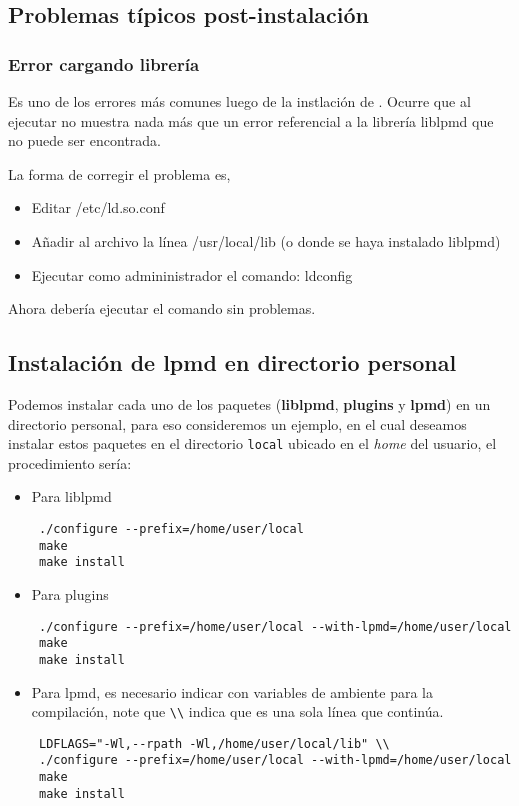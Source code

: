 \subsection{Problemas t\'ipicos post-instalaci\'on}

\subsubsection{Error cargando librer\'ia}

Es uno de los errores m\'as comunes luego de la instlaci\'on de {\lpmd}. Ocurre que al ejecutar {\lpmd} no muestra nada m\'as que un error referencial a la librer\'ia liblpmd que no puede ser encontrada.

La forma de corregir el problema es,

\begin{itemize}
 \item Editar /etc/ld.so.conf
 \item A\~nadir al archivo la l\'inea /usr/local/lib (o donde se haya instalado liblpmd)
 \item Ejecutar como admininistrador el comando: ldconfig
\end{itemize}

Ahora deber\'ia ejecutar el comando sin problemas.

\subsection{Instalaci\'on de lpmd en directorio personal}
\label{subsub:personaldir}

Podemos instalar cada uno de los paquetes (\textbf{liblpmd}, \textbf{plugins} y \textbf{lpmd}) en un directorio personal, para eso consideremos un ejemplo, en el cual deseamos instalar estos paquetes en el directorio \verb|local| ubicado en el \textit{home} del usuario, el procedimiento ser\'ia:

\begin{itemize}
 \item Para liblpmd
 \begin{verbatim}
 ./configure --prefix=/home/user/local
 make
 make install
 \end{verbatim}
 \item Para plugins
 \begin{verbatim}
 ./configure --prefix=/home/user/local --with-lpmd=/home/user/local
 make
 make install
 \end{verbatim}
 \item Para lpmd, es necesario indicar con variables de ambiente para la compilaci\'on, note que \verb|\\| indica que es una sola l\'inea que contin\'ua.
 \begin{verbatim}
 LDFLAGS="-Wl,--rpath -Wl,/home/user/local/lib" \\
 ./configure --prefix=/home/user/local --with-lpmd=/home/user/local
 make
 make install
 \end{verbatim}
\end{itemize}

